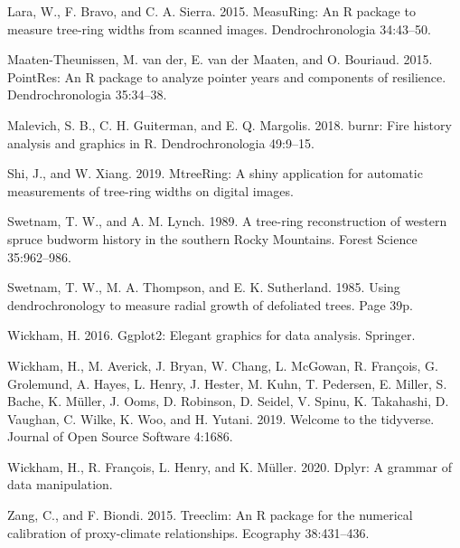 \documentclass[review]{elsarticle} %
\begin{document}
\leavevmode\hypertarget{ref-Lara2015}{}%
Lara, W., F. Bravo, and C. A. Sierra. 2015. MeasuRing: An R package to
measure tree-ring widths from scanned images. Dendrochronologia
34:43--50.

\leavevmode\hypertarget{ref-VanderMaaten-Theunissen2015}{}%
Maaten-Theunissen, M. van der, E. van der Maaten, and O. Bouriaud. 2015.
PointRes: An R package to analyze pointer years and components of
resilience. Dendrochronologia 35:34--38.

\leavevmode\hypertarget{ref-Malevich2018}{}%
Malevich, S. B., C. H. Guiterman, and E. Q. Margolis. 2018. burnr: Fire
history analysis and graphics in R. Dendrochronologia 49:9--15.

\leavevmode\hypertarget{ref-Shi2019}{}%
Shi, J., and W. Xiang. 2019. MtreeRing: A shiny application for
automatic measurements of tree-ring widths on digital images.

\leavevmode\hypertarget{ref-Swetnam1989}{}%
Swetnam, T. W., and A. M. Lynch. 1989. A tree-ring reconstruction of
western spruce budworm history in the southern Rocky Mountains. Forest
Science 35:962--986.

\leavevmode\hypertarget{ref-Swetnam1985}{}%
Swetnam, T. W., M. A. Thompson, and E. K. Sutherland. 1985. Using
dendrochronology to measure radial growth of defoliated trees. Page 39p.

\leavevmode\hypertarget{ref-wickham2016ggplot2}{}%
Wickham, H. 2016. Ggplot2: Elegant graphics for data analysis. Springer.

\leavevmode\hypertarget{ref-Wickham2019}{}%
Wickham, H., M. Averick, J. Bryan, W. Chang, L. McGowan, R. François, G.
Grolemund, A. Hayes, L. Henry, J. Hester, M. Kuhn, T. Pedersen, E.
Miller, S. Bache, K. Müller, J. Ooms, D. Robinson, D. Seidel, V. Spinu,
K. Takahashi, D. Vaughan, C. Wilke, K. Woo, and H. Yutani. 2019. Welcome
to the tidyverse. Journal of Open Source Software 4:1686.

\leavevmode\hypertarget{ref-Wickham2020dplyr}{}%
Wickham, H., R. François, L. Henry, and K. Müller. 2020. Dplyr: A
grammar of data manipulation.

\leavevmode\hypertarget{ref-Zang2015}{}%
Zang, C., and F. Biondi. 2015. Treeclim: An R package for the numerical
calibration of proxy-climate relationships. Ecography 38:431--436.
\end{document}
